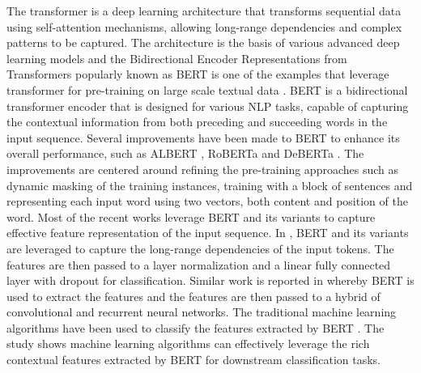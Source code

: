 \documentclass[preprint,12pt]{elsarticle}
\begin{document}
The transformer is a deep learning architecture that transforms sequential data using self-attention mechanisms, allowing long-range dependencies and complex patterns to be captured. The architecture is the basis of various advanced deep learning models and the Bidirectional Encoder Representations from Transformers popularly known as BERT is one of the examples that leverage transformer for pre-training on large scale textual data \citep{devlin_bert_2018}. BERT is a bidirectional transformer encoder that is designed for various NLP tasks, capable of capturing the contextual information from both preceding and succeeding words in the input sequence. Several improvements have been made to BERT to enhance its overall performance, such as ALBERT \citep{lan_albert_2019}, RoBERTa \citep{liu_roberta_2019} and DeBERTa \citep{he_deberta_2020}. The improvements are centered around refining the pre-training approaches such as dynamic masking of the training instances, training with a block of sentences and representing each input word using two vectors, both content and position of the word. Most of the recent works leverage BERT and its variants to capture effective feature representation of the input sequence. In \citep{rodrawangpai_improving_2022}, BERT and its variants are leveraged to capture the long-range dependencies of the input tokens. The features are then passed to a layer normalization and a linear fully connected layer with dropout for classification. Similar work is reported in \citep{murfi_bert-based_2024} whereby BERT is used to extract the features and the features are then passed to a hybrid of convolutional and recurrent neural networks. The traditional machine learning algorithms have been used to classify the features extracted by BERT \citep{hao_sentiment_2023}. The study shows machine learning algorithms can effectively leverage the rich contextual features extracted by BERT for downstream classification tasks. 
\end{document}
